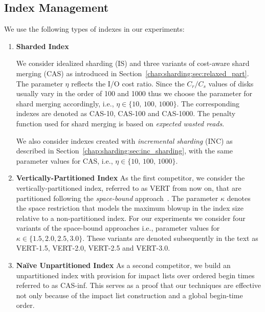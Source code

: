 \subsection{Index Management}
 We use the following types of indexes in our experiments:

\begin{enumerate}

\item
\textbf{Sharded Index}
  { We consider idealized sharding (IS) and three variants of cost-aware shard merging (CAS) as introduced in Section~\ref{chap:sharding:sec:relaxed_part}. The parameter $\eta$ reflects the I/O cost ratio. Since the $C_r/C_s$ values of disks usually vary in the order of 100 and 1000 thus we choose the parameter for shard merging accordingly, i.e., $\eta \in \{ 10, \,100, \,1000 \}$. The corresponding indexes are denoted as CAS-10, CAS-100 and CAS-1000. The penalty function used for shard merging is based on \emph{expected wasted reads}.

   We also consider indexes created with \emph{incremental sharding} (INC) as described in Section~\ref{chap:sharding:sec:inc_sharding}, with the same parameter values for CAS, i.e., $\eta \in \{ 10, \,100, \,1000 \}$.}


\item
\textbf{Vertically-Partitioned Index}
  {As the first competitor, we consider the vertically-partitioned index, referred to as VERT from now on, that are partitioned
    following the \emph{space-bound}
    approach~\cite{kberberi:sigir2007}. The parameter $\kappa$ denotes
    the space restriction that models the maximum blowup in the index size
    relative to a non-partitioned index. For our experiments we
    consider four variants of the space-bound approaches i.e.,
    parameter values for $\kappa \in \{1.5, 2.0, 2.5, 3.0\}$. These
    variants are denoted subsequently in the text as VERT-1.5, VERT-2.0,
    VERT-2.5 and VERT-3.0.}
    

\item
\textbf{Na\"ive Unpartitioned Index}
  { As a second competitor, we build an unpartitioned index with
    provision for impact lists over ordered begin times referred to as
    CAS-inf. This serves as a proof that our techniques are effective
    not only because of the impact list construction and a global
    begin-time order.}
\end{enumerate}    

